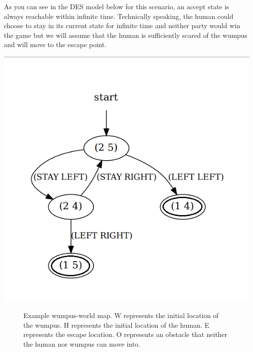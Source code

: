 \documentclass[12pt,letterpaper]{ntdhw}
\begin{document}
\begin{enumerate}
    \begin{center}
      \label{fig:map4}
    \end{center}
As you can see in the DES model below for this scenario, an accept state is always reachable within infinite time. Technically speaking, the human could choose to stay in its current state for infinite time and neither party would win the game but we will assume that the human is sufficiently scared of the wumpus and will move to the escape point.
\begin{center}
\includegraphics[scale=0.5]{Q4_graphviz.png}
\end{center}

\begin{figure}[b]
  \centering
  \caption{Example wumpus-world map.  W represents the initial
    location of the wumpus.  H represents the initial location of the
    human.  E represents the escape location.  O represents an
    obstacle that neither the human nor wumpus can move into.}
  \label{fig:map}
\end{figure}
\end{enumerate}
\end{document}
